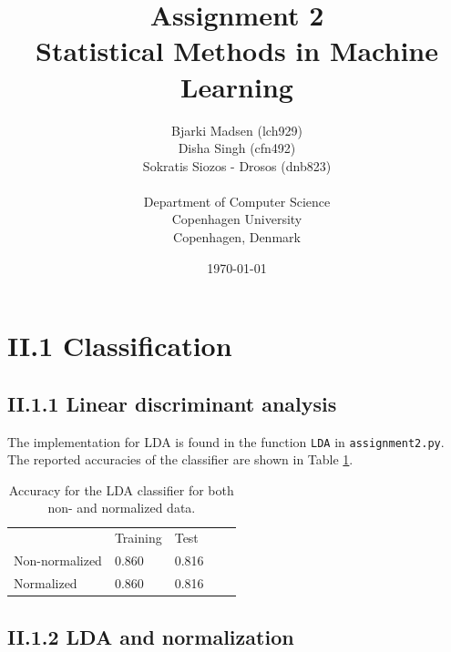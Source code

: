 \documentclass[12pt]{article}
\newcommand{\assignmentname}{Assignment 2}
\newcommand{\coursename}{Statistical Methods in Machine Learning}
\newcommand{\studentnameOne}{Bjarki Madsen (lch929)}
\newcommand{\studentnameTwo}{Disha Singh (cfn492)}
\newcommand{\studentnameThree}{Sokratis Siozos - Drosos (dnb823)}
\newcommand{\department}{Department of Computer Science}
\newcommand{\institution}{Copenhagen University}
\newcommand{\location}{Copenhagen, Denmark}
\begin{document}
\renewcommand\refname{References}

\title{\assignmentname \\ {\Large {\textsc \coursename}}}
\author{
        \studentnameOne \\
        \studentnameTwo \\
        \studentnameThree \\ \\
                \department \\
        \institution \\
        \location
}
\date{\today}

\maketitle
\thispagestyle{empty}

\pagebreak

\section*{II.1 Classification}

  \subsection*{II.1.1 Linear discriminant analysis}

    The implementation for LDA is found in the function \texttt{LDA} in \texttt{assignment2.py}. The reported accuracies of the classifier are shown in Table \ref{table:accuracy_LDA}.

    \begin{table}[h]
      \centering
      \begin{tabular}{lllll}
        \cline{2-3}
        \multicolumn{1}{l|}{}                & \multicolumn{1}{l|}{Training} & \multicolumn{1}{l|}{Test}  &  &  \\ \cline{1-3}
        \multicolumn{1}{|l|}{Non-normalized} & \multicolumn{1}{l|}{0.860}    & \multicolumn{1}{l|}{0.816} &  &  \\
        \multicolumn{1}{|l|}{Normalized}     & \multicolumn{1}{l|}{0.860}    & \multicolumn{1}{l|}{0.816} &  &  \\ \cline{1-3}
        \end{tabular}
      \caption{Accuracy for the LDA classifier for both non- and normalized data. }
      \label{table:accuracy_LDA}
    \end{table}

  \subsection*{II.1.2 LDA and normalization} 
\end{document}
